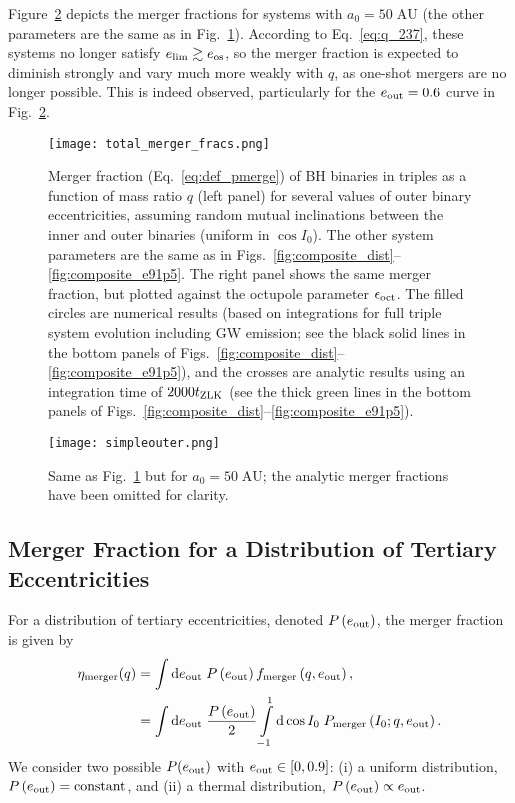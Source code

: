 \documentclass[
        fleqn,
        usenatbib,
    ]{mnras}
\newcommand*{\p}[1]{\left(#1\right)}
\begin{document}
Figure~\ref{fig:sweepbin_simpleouter} depicts the merger fractions for systems
with $a_0 = 50\;\mathrm{AU}$ (the other parameters are the same as in
Fig.~\ref{fig:total_merger_fracs}). According to Eq.~\eqref{eq:q_237}, these
systems no longer satisfy $e_{\lim} \gtrsim e_{\rm os}$, so the
merger fraction is expected to diminish strongly and vary much more weakly with
$q$, as one-shot mergers are no longer possible. This is indeed observed,
particularly for the $e_{\rm out} = 0.6$ curve in
Fig.~\ref{fig:sweepbin_simpleouter}.

\begin{figure*}
    \centering
    \texttt{[image: total\_merger\_fracs.png]}
    \caption{
    Merger fraction (Eq.~\ref{eq:def_pmerge}) of BH binaries in triples as a
    function of mass ratio $q$ (left panel) for several values of outer binary
    eccentricities, assuming random mutual inclinations between the inner and
    outer binaries (uniform in $\cos I_0$). The other system parameters are the
    same as in Figs.~\ref{fig:composite_dist}--\ref{fig:composite_e91p5}. The
    right panel shows the same merger fraction, but plotted against the octupole
    parameter $\epsilon_{\rm oct}$.  The filled circles are numerical results
    (based on integrations for full triple system evolution including GW
    emission; see the black solid lines in the bottom panels of
    Figs.~\ref{fig:composite_dist}--\ref{fig:composite_e91p5}), and the crosses
    are analytic results using an integration time of $2000 t_{\rm ZLK}$
    (see the thick green lines in the bottom panels of
    Figs.~\ref{fig:composite_dist}--\ref{fig:composite_e91p5}).
    }\label{fig:total_merger_fracs}
\end{figure*}
\begin{figure*}
    \centering
    \texttt{[image: simpleouter.png]}
    \caption{Same as Fig.~\ref{fig:total_merger_fracs} but for $a_0 =
    50\;\mathrm{AU}$; the analytic merger fractions have been omitted for
    clarity.
    }\label{fig:sweepbin_simpleouter}
\end{figure*}

\subsection{Merger Fraction for a Distribution of Tertiary Eccentricities}

For a distribution of tertiary eccentricities, denoted $P\p{e_{\rm out}}$, the
merger fraction is given by
\begin{align}
    \eta_{\rm merger}(q) &= \int \mathrm{d}e_{\rm out}\;
            P\p{e_{\rm out}} f_{\rm merger}\p{q, e_{\rm out}},\nonumber\\
        &= \int\limits\mathrm{d} e_{\rm out}\; \frac{P\p{e_{\rm out}}}{2}
            \int\limits_{-1}^1\mathrm{d} \cos I_0\; P_{\rm merger}\p{I_0; q,
            e_{\rm out}}.
        \label{eq:def_eta_merge}
\end{align}
We consider two possible $P(e_{\rm out})$ with $e_{\rm out} \in [0, 0.9]$: (i) a
uniform distribution, $P\p{e_{\rm out}} = \textrm{constant}$, and (ii) a thermal
distribution, $P\p{e_{\rm out}} \propto e_{\rm out}$.
\end{document}
